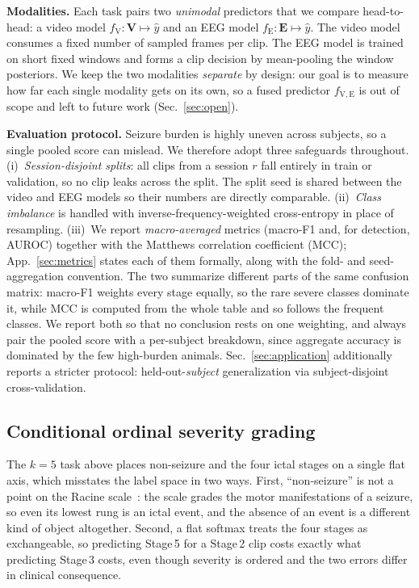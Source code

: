 \noindent\textbf{Modalities.}
Each task pairs two \emph{unimodal} predictors that we compare head-to-head:
a video model $f_{\mathrm{V}}:\mathbf{V}\mapsto\hat{y}$ and an EEG model
$f_{\mathrm{E}}:\mathbf{E}\mapsto\hat{y}$. The video model consumes a fixed number
of sampled frames per clip. The EEG model is trained on short fixed windows and
forms a clip decision by mean-pooling the window posteriors. We keep the two
modalities \emph{separate} by design: our goal is to measure how far each single
modality gets on its own, so a fused predictor $f_{\mathrm{V,E}}$ is out of scope
and left to future work (Sec.~\ref{sec:open}).

\noindent\textbf{Evaluation protocol.}
Seizure burden is highly uneven across subjects, so a single pooled score can
mislead. We therefore adopt three safeguards throughout. (i)~\emph{Session-disjoint
splits}: all clips from a session $r$ fall entirely in train or validation, so no
clip leaks across the split. The split seed is shared between the
video and EEG models so their numbers are directly comparable. (ii)~\emph{Class
imbalance} is handled with inverse-frequency-weighted cross-entropy in place of
resampling. (iii)~We report \emph{macro-averaged} metrics (macro-F1 and, for
detection, AUROC) together with the Matthews correlation coefficient (MCC);
App.~\ref{sec:metrics} states each of them formally, along with the
fold- and seed-aggregation convention.
The two summarize different parts of the same confusion matrix: macro-F1 weights
every stage equally, so the rare severe classes dominate it, while MCC is computed
from the whole table and so follows the frequent classes. We report both so
that no conclusion rests on one weighting, and always pair the pooled score with a
per-subject breakdown, since aggregate accuracy is dominated by the few high-burden animals.
Sec.~\ref{sec:application} additionally reports a stricter protocol:
held-out-\emph{subject} generalization via subject-disjoint cross-validation.

\subsection{Conditional ordinal severity grading}
\label{sec:problem:ordinal}

The $k{=}5$ task above places non-seizure and the four ictal stages on a single
flat axis, which misstates the label space in two ways. First, ``non-seizure'' is
not a point on the Racine scale~\cite{racine1972}: the scale grades the motor
manifestations of a seizure, so even its lowest rung is an ictal event, and the
absence of an event is a different kind of object altogether. Second, a flat
softmax treats the four stages as exchangeable, so predicting Stage\,5 for a
Stage\,2 clip costs exactly what predicting Stage\,3 costs, even though severity is
ordered and the two errors differ in clinical consequence.


